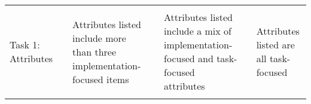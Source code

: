 \documentclass[]{article}
\begin{document}
\begin{longtable}[]{@{}lllllll@{}}
\begin{minipage}[t]{0.03\columnwidth}
\strut
\end{minipage} & \begin{minipage}[t]{0.20\columnwidth}\raggedright
\strut
\end{minipage}\tabularnewline
\begin{minipage}[t]{0.19\columnwidth}\raggedright
Task 1: Attributes\strut
\end{minipage} & \begin{minipage}[t]{0.03\columnwidth}\raggedright
\strut
\end{minipage} & \begin{minipage}[t]{0.16\columnwidth}\raggedright
Attributes listed include more than three implementation-focused
items\strut
\end{minipage} & \begin{minipage}[t]{0.03\columnwidth}\raggedright
\strut
\end{minipage} & \begin{minipage}[t]{0.19\columnwidth}\raggedright
Attributes listed include a mix of implementation-focused and
task-focused attributes\strut
\end{minipage} & \begin{minipage}[t]{0.03\columnwidth}\raggedright
\strut
\end{minipage} & \begin{minipage}[t]{0.20\columnwidth}\raggedright
Attributes listed are all task-focused\strut
\end{minipage}\tabularnewline
\begin{minipage}[t]{0.19\columnwidth}\raggedright
\strut
\end{minipage} & \begin{minipage}[t]{0.03\columnwidth}\raggedright
\strut
\end{minipage} & \begin{minipage}[t]{0.16\columnwidth}\raggedright
\strut
\end{minipage} & \begin{minipage}[t]{0.03\columnwidth}\raggedright
\strut
\end{minipage} & \begin{minipage}[t]{0.19\columnwidth}\raggedright
\strut
\end{minipage} & \begin{minipage}[t]{0.03\columnwidth}\raggedright
\strut
\end{minipage} & \begin{minipage}[t]{0.20\columnwidth}\raggedright
\strut
\end{minipage}\tabularnewline

\end{longtable}
\end{document}
